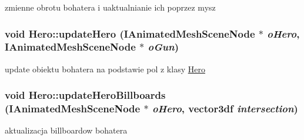 zmienne obrotu bohatera i uaktualnianie ich poprzez mysz \hypertarget{class_hero_ad57516db78b85e46ff6f063c6247a05c}{
\subsubsection[{updateHero}]{\setlength{\rightskip}{0pt plus 5cm}void Hero::updateHero (IAnimatedMeshSceneNode $\ast$ {\em oHero}, \/  IAnimatedMeshSceneNode $\ast$ {\em oGun})}}
\label{class_hero_ad57516db78b85e46ff6f063c6247a05c}
update obiektu bohatera na podstawie pol z klasy \hyperlink{class_hero}{Hero} \hypertarget{class_hero_a31dd095888381f04a7ea22af8a8e40df}{
\subsubsection[{updateHeroBillboards}]{\setlength{\rightskip}{0pt plus 5cm}void Hero::updateHeroBillboards (IAnimatedMeshSceneNode $\ast$ {\em oHero}, \/  vector3df {\em intersection})}}
\label{class_hero_a31dd095888381f04a7ea22af8a8e40df}
aktualizacja billboardow bohatera 

